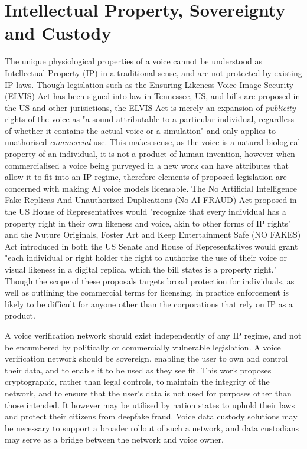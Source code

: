 \documentclass[11pt,a4paper]{article}
\begin{document}
\section{Intellectual Property, Sovereignty and Custody}
\label{sec:conclusion}
The unique physiological properties of a voice cannot be understood as Intellectual Property (IP) in a traditional sense, and are not protected by existing IP laws.
Though legislation such as the Ensuring Likeness Voice Image Security (ELVIS) Act has been signed into law in Tennessee, US, and bills are proposed in the US and other jurisictions, the ELVIS Act is merely an expansion of \textit{publicity} rights of the voice as "a sound attributable to a particular individual, regardless of whether it contains the actual voice or a simulation" and only applies to unathorised \textit{commercial} use.
This makes sense, as the voice is a natural biological property of an individual, it is not a product of human invention, however when commercialised a voice being purveyed in a new work can have attributes that allow it to fit into an IP regime, therefore elements of proposed legislation are concerned with making AI voice models licensable.
The No Artificial Intelligence Fake Replicas And Unauthorized Duplications (No AI FRAUD) Act proposed in the US House of Representatives would "recognize that every individual has a property right in their own likeness and voice, akin to other forms of IP rights" and the Nuture Originals, Foster Art and Keep Entertainment Safe (NO FAKES) Act introduced in both the US Senate and House of Representatives would grant "each individual or right holder the right to authorize the use of their voice or visual likeness in a digital replica, which the bill states is a property right."
Though the scope of these proposals targets broad protection for individuals, as well as outlining the commercial terms for licensing, in practice enforcement is likely to be difficult for anyone other than the corporations that rely on IP as a product.

A voice verification network should exist independently of any IP regime, and not be encumbered by politically or commercially vulnerable legislation.
A voice verification network should be sovereign, enabling the user to own and control their data, and to enable it to be used as they see fit.
This work proposes cryptographic, rather than legal controls, to maintain the integrity of the network, and to ensure that the user's data is not used for purposes other than those intended.
It however may be utilised by nation states to uphold their laws and protect their citizens from deepfake fraud.
Voice data custody solutions may be necessary to support a broader rollout of such a network, and data custodians may serve as a bridge between the network and voice owner.
\end{document}
